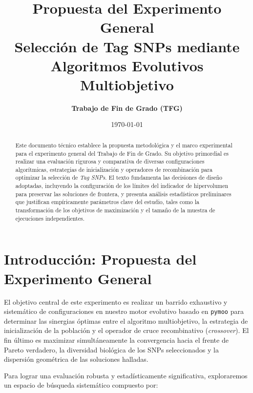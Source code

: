 \documentclass[a4paper,10pt]{article}
\title{\textbf{Propuesta del Experimento General \\ Selección de Tag SNPs mediante Algoritmos Evolutivos Multiobjetivo}}
\author{\textbf{Trabajo de Fin de Grado (TFG)}}
\date{\today}
\begin{document}
\maketitle

\begin{abstract}
Este documento técnico establece la propuesta metodológica y el marco experimental para el experimento general del Trabajo de Fin de Grado. Su objetivo primordial es realizar una evaluación rigurosa y comparativa de diversas configuraciones algorítmicas, estrategias de inicialización y operadores de recombinación para optimizar la selección de \textit{Tag SNPs}. El texto fundamenta las decisiones de diseño adoptadas, incluyendo la configuración de los límites del indicador de hipervolumen para preservar las soluciones de frontera, y presenta análisis estadísticos preliminares que justifican empíricamente parámetros clave del estudio, tales como la transformación de los objetivos de maximización y el tamaño de la muestra de ejecuciones independientes.
\end{abstract}

\newpage

{
\setlength{\parskip}{0pt}
\tableofcontents
}

\clearpage

\section{Introducción: Propuesta del Experimento General}

El objetivo central de este experimento es realizar un barrido exhaustivo y sistemático de configuraciones en nuestro motor evolutivo basado en \texttt{pymoo} para determinar las sinergias óptimas entre el algoritmo multiobjetivo, la estrategia de inicialización de la población y el operador de cruce recombinativo (\textit{crossover}). El fin último es maximizar simultáneamente la convergencia hacia el frente de Pareto verdadero, la diversidad biológica de los SNPs seleccionados y la dispersión geométrica de las soluciones halladas.

Para lograr una evaluación robusta y estadísticamente significativa, exploraremos un espacio de búsqueda sistemático compuesto por:
\end{document}
